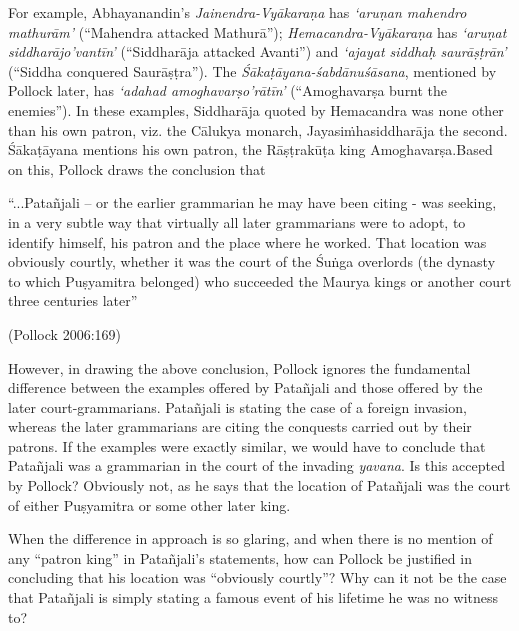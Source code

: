 For example, Abhayanandin's {\sl Jainendra-Vyākaraṇa} has {\sl `aruṇan mahendro mathurām'} (``Mahendra attacked Mathurā''); {\sl Hemacandra-Vyākaraṇa} has {\sl `aruṇat siddharājo’vantīn'} (``Siddharāja attacked Avanti'') and {\sl `ajayat siddhaḥ saurāṣṭrān'} (``Siddha conquered Saurāṣṭra''). The {\sl Śākaṭāyana-śabdānuśāsana}, mentioned by Pollock later, has {\sl `adahad amoghavarṣo'\-rātīn'} (``Amoghavarṣa burnt the enemies''). In these examples, Siddharāja quoted by Hemacandra was none other than his own patron, viz. the Cālukya monarch, Jayasiṁhasiddharāja the second. Śākaṭā\-yana mentions his own patron, the Rāṣṭrakūṭa king Amoghavarṣa.\break Based on this, Pollock draws the conclusion that 
\begin{myquote}
``...Patañjali -- or the earlier grammarian he may have been citing - was seeking, in a very subtle way that virtually all later grammarians were to adopt, to identify himself, his patron and the place where he worked. That location was obviously courtly, whether it was the court of the Śuṅga overlords (the dynasty to which Puṣyamitra belonged) who succeeded the Maurya kings or another court three centuries later''

\hfill (Pollock 2006:169)
\end{myquote}

However, in drawing the above conclusion, Pollock ignores the fundamental difference between the examples offered by Patañjali and those offered by the later court-grammarians. Patañjali is stating the case of a foreign invasion, whereas the later grammarians are citing the conquests carried out by their patrons. If the examples were exactly similar, we would have to conclude that Patañjali was a grammarian in the court of the invading {\sl yavana}. Is this accepted by Pollock? Obviously not, as he says that the location of Patañjali was the court of either Puṣyamitra or some other later king.

When the difference in approach is so glaring, and when there is no mention of any ``patron king'' in Patañjali's statements, how can Pollock be justified in concluding that his location was ``obviously courtly''? Why can it not be the case that Patañjali is simply stating a famous event of his lifetime he was no witness to?\\[-17pt]

